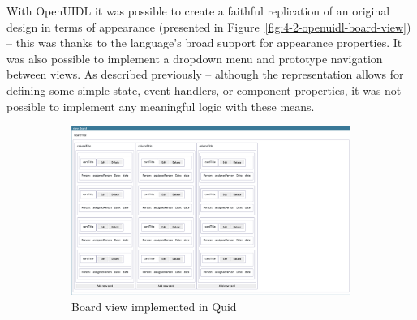 With OpenUIDL it was possible to create a faithful replication of an original design in terms of appearance (presented in Figure~\ref{fig:4-2-openuidl-board-view}) -- this was thanks to the language's broad support for appearance properties.
It was also possible to implement a dropdown menu and prototype navigation between views.
As described previously -- although the representation allows for defining some simple state, event handlers, or component properties, it was not possible to implement any meaningful logic with these means.

\begin{figure}
    \centering
    \begin{subfigure}[m]{0.5\textwidth}
        \centering
        \includegraphics[height=0.2\textheight]{./4-results-and-discussion/quid-board-view}
        \caption{Board view implemented in Quid}
        \label{fig:4-2-quid-board-view}
    \end{subfigure}
    \hfill
    \begin{subfigure}[m]{0.35\textwidth}
        \centering

\end{subfigure}
\end{figure}
